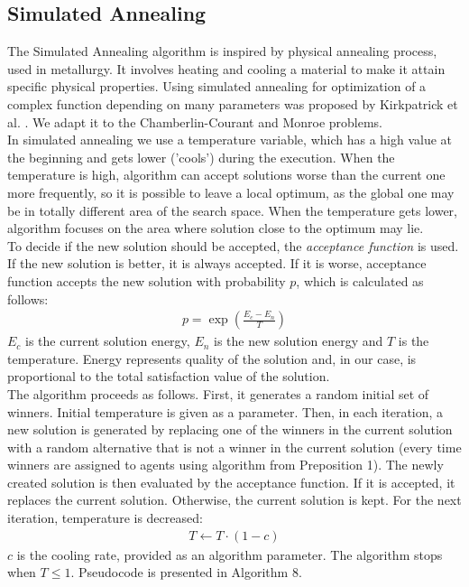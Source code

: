 \subsection{Simulated Annealing}

The Simulated Annealing algorithm is inspired by physical annealing process, used in metallurgy. It involves heating and cooling a material to make it attain specific physical properties. Using simulated annealing for optimization of a complex function depending on many parameters was proposed by Kirkpatrick et al. \cite{7}. We adapt it to the Chamberlin-Courant and Monroe problems.
\\

In simulated annealing we use a temperature variable, which has a high value at the beginning and gets lower ('cools') during the execution. When the temperature is high, algorithm can accept solutions worse than the current one more frequently, so it is possible to leave a local optimum, as the global one may be in totally different area of the search space. When the temperature gets lower, algorithm focuses on the area where solution close to the optimum may lie.
\\

To decide if the new solution should be accepted, the \textit{acceptance function} is used. If the new solution is better, it is always accepted. If it is worse, acceptance function accepts the new solution with probability $p$, which is calculated as follows:
\begin{gather}
	p = \exp(\frac{E_{c}-E_{n}}{T})
\end{gather}
$E_{c}$ is the current solution energy, $E_{n}$ is the new solution energy and $T$ is the temperature. Energy represents quality of the solution and, in our case, is proportional to the total satisfaction value of the solution.
\\

The algorithm proceeds as follows. First, it generates a random initial set of winners. Initial temperature is given as a parameter. Then, in each iteration, a new solution is generated by replacing one of the winners in the current solution with a random alternative that is not a winner in the current solution (every time winners are assigned to agents using algorithm from Preposition 1). The newly created solution is then evaluated by the acceptance function. If it is accepted, it replaces the current solution. Otherwise, the current solution is kept. For the next iteration, temperature is decreased:
\begin{gather}
	T \gets T \cdot (1 - c)
\end{gather}
$c$ is the cooling rate, provided as an algorithm parameter. The algorithm stops when $T \leq 1$. Pseudocode is presented in Algorithm 8.

